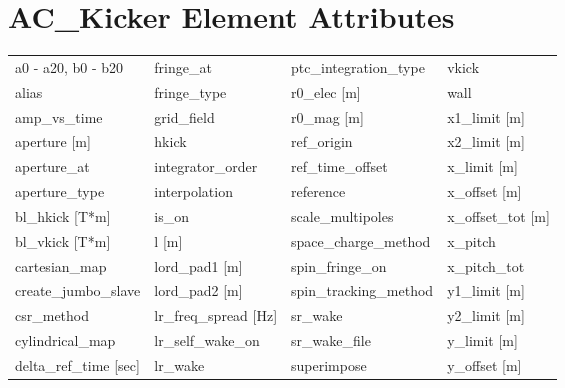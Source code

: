  \section{AC_Kicker Element Attributes}
 \label{s:list.ac.kicker}
 
 \begin{tabular}{llll} \toprule
a0 - a20, b0 - b20             & fringe_at                      & ptc_integration_type           & vkick                          \\
alias                          & fringe_type                    & r0_elec [m]                    & wall                           \\
amp_vs_time                    & grid_field                     & r0_mag [m]                     & x1_limit [m]                   \\
aperture [m]                   & hkick                          & ref_origin                     & x2_limit [m]                   \\
aperture_at                    & integrator_order               & ref_time_offset                & x_limit [m]                    \\
aperture_type                  & interpolation                  & reference                      & x_offset [m]                   \\
bl_hkick [T*m]                 & is_on                          & scale_multipoles               & x_offset_tot [m]               \\
bl_vkick [T*m]                 & l [m]                          & space_charge_method            & x_pitch                        \\
cartesian_map                  & lord_pad1 [m]                  & spin_fringe_on                 & x_pitch_tot                    \\
create_jumbo_slave             & lord_pad2 [m]                  & spin_tracking_method           & y1_limit [m]                   \\
csr_method                     & lr_freq_spread [Hz]            & sr_wake                        & y2_limit [m]                   \\
cylindrical_map                & lr_self_wake_on                & sr_wake_file                   & y_limit [m]                    \\
delta_ref_time [sec]           & lr_wake                        & superimpose                    & y_offset [m]                   \\

\end{tabular}
